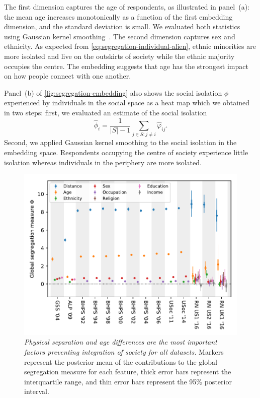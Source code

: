 \documentclass{scrartcl}
\newcommand{\card}[1]{\left|#1\right|}
\newcommand{\titlecaption}[2]{\caption[#1]{\emph{#1} #2}}
\begin{document}
The first dimension captures the age of respondents, as illustrated in panel~(a): the mean age increases monotonically as a function of the first embedding dimension, and the standard deviation is small. We evaluated both statistics using Gaussian kernel smoothing~\cite[chapter~6]{Hastie2009}. The second dimension captures sex and ethnicity. As expected from \cref{eq:segregation-individual-alien}, ethnic minorities are more isolated and live on the outskirts of society while the ethnic majority occupies the centre. The embedding suggests that age has the strongest impact on how people connect with one another.

Panel~(b) of \cref{fig:segregation-embedding} also shows the social isolation $\phi$ experienced by individuals in the social space as a heat map which we obtained in two steps: first, we evaluated an estimate of the social isolation
\[
    \hat\phi_i = \frac{1}{\card{S}-1}\sum_{j\in S:j\neq i} \hat\varphi_{ij}.
\]
Second, we applied Gaussian kernel smoothing to the social isolation in the embedding space. Respondents occupying the centre of society experience little isolation whereas individuals in the periphery are more isolated.

\begin{figure}
    \includegraphics{segregation-survey}
    \titlecaption{Physical separation and age differences are the most important factors preventing integration of society for all datasets.}{Markers represent the posterior mean of the contributions to the global segregation measure for each feature,  thick error bars represent the interquartile range, and thin error bars represent the 95\% posterior interval.\label{fig:segregation-survey}}
\end{figure}
\end{document}
